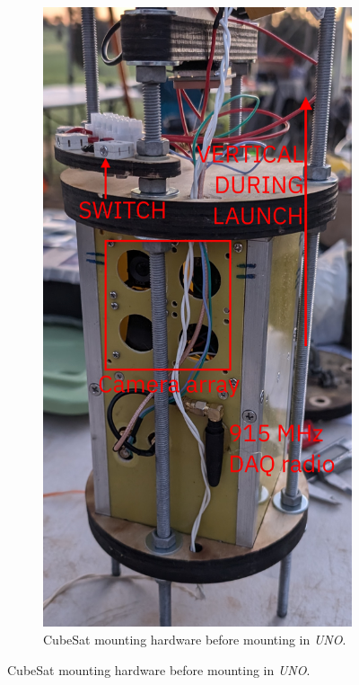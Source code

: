 \documentclass{report}
\begin{document}
\begin{figure}[H]
  \begin{subfigure}{0.495\textwidth}
    \centering
    \includegraphics[width=\linewidth]{images/cubesat-payload-bay.jpg}
    \caption{CubeSat mounting hardware before mounting in \textit{UNO}.}

\end{subfigure}
\end{figure}
\end{document}
